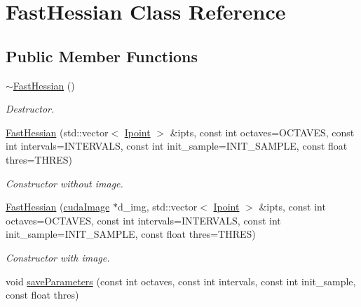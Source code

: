 \hypertarget{classFastHessian}{\section{Fast\-Hessian Class Reference}
\label{classFastHessian}
}
\subsection*{Public Member Functions}
\begin{DoxyCompactItemize}
\item 
\hypertarget{classFastHessian_a89cb5f6c6f0266b38cc50b5198982a97}{\hyperlink{classFastHessian_a89cb5f6c6f0266b38cc50b5198982a97}{$\sim$\-Fast\-Hessian} ()}\label{classFastHessian_a89cb5f6c6f0266b38cc50b5198982a97}

\begin{DoxyCompactList}\small\item\em Destructor. \end{DoxyCompactList}\item 
\hypertarget{classFastHessian_a10dc3c811fc013b4a910dc4d2c9a8952}{\hyperlink{classFastHessian_a10dc3c811fc013b4a910dc4d2c9a8952}{Fast\-Hessian} (std\-::vector$<$ \hyperlink{classIpoint}{Ipoint} $>$ \&ipts, const int octaves=O\-C\-T\-A\-V\-E\-S, const int intervals=I\-N\-T\-E\-R\-V\-A\-L\-S, const int init\-\_\-sample=I\-N\-I\-T\-\_\-\-S\-A\-M\-P\-L\-E, const float thres=T\-H\-R\-E\-S)}\label{classFastHessian_a10dc3c811fc013b4a910dc4d2c9a8952}

\begin{DoxyCompactList}\small\item\em Constructor without image. \end{DoxyCompactList}\item 
\hypertarget{classFastHessian_a925a0261ff185694b5579baea846adde}{\hyperlink{classFastHessian_a925a0261ff185694b5579baea846adde}{Fast\-Hessian} (\hyperlink{structcudaImage}{cuda\-Image} $\ast$d\-\_\-img, std\-::vector$<$ \hyperlink{classIpoint}{Ipoint} $>$ \&ipts, const int octaves=O\-C\-T\-A\-V\-E\-S, const int intervals=I\-N\-T\-E\-R\-V\-A\-L\-S, const int init\-\_\-sample=I\-N\-I\-T\-\_\-\-S\-A\-M\-P\-L\-E, const float thres=T\-H\-R\-E\-S)}\label{classFastHessian_a925a0261ff185694b5579baea846adde}

\begin{DoxyCompactList}\small\item\em Constructor with image. \end{DoxyCompactList}\item 
\hypertarget{classFastHessian_a044caf448bc9335c1176fe4f084ff1d1}{void \hyperlink{classFastHessian_a044caf448bc9335c1176fe4f084ff1d1}{save\-Parameters} (const int octaves, const int intervals, const int init\-\_\-sample, const float thres)}\label{classFastHessian_a044caf448bc9335c1176fe4f084ff1d1}


\end{DoxyCompactItemize}
